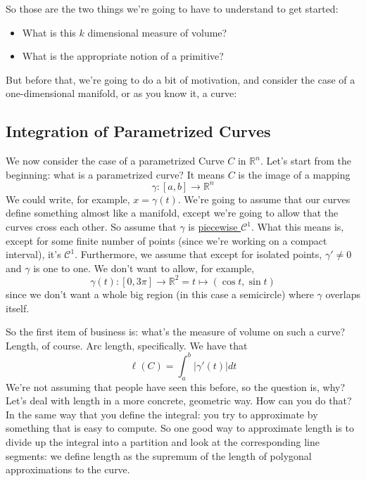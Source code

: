 \documentclass{article}
\newcommand{\reals}[0]{\mathbb{R}}
\newcommand{\mc}[1]{\mathcal{#1}}
\begin{document}
So those are the two things we're going to have to understand to get started:
\begin{itemize}
  \item What is this \(k\) dimensional measure of volume?
  \item What is the appropriate notion of a primitive?
\end{itemize}
But before that, we're going to do a bit of motivation, and consider the case of a one-dimensional manifold, or as you know it, a curve:

\subsection{Integration of Parametrized Curves}

We now consider the case of a parametrized Curve \(C\) in \(\reals^n\). Let's start from the beginning: what is a parametrized curve? It means \(C\) is the image of a mapping
\begin{equation}
  \gamma : [a, b] \to \reals^n
\end{equation}
We could write, for example, \(x = \gamma(t)\). We're going to assume that our curves define something almost like a manifold, except we're going to allow that the curves cross each other. So assume that \(\gamma\) is \underline{piecewise \(\mc{C}^1\)}. What this means is, except for some finite number of points (since we're working on a compact interval), it's \(\mc{C}^1\). Furthermore, we assume that except for isolated points, \(\gamma' \neq 0\) and \(\gamma\) is one to one.
We don't want to allow, for example,
\begin{equation}
  \gamma(t): [0, 3\pi] \to \reals^2 = t \mapsto (\cos t, \sin t)
\end{equation}
since we don't want a whole big region (in this case a semicircle) where \(\gamma\) overlaps itself.

So the first item of business is: what's the measure of volume on such a curve? Length, of course. Arc length, specifically. We have that
\begin{equation}
  \ell(C) = \int_a^b|\gamma'(t)|dt
\end{equation}
We're not assuming that people have seen this before, so the question is, why? Let's deal with length in a more concrete, geometric way. How can you do that? In the same way that you define the integral: you try to approximate by something that is easy to compute. So one good way to approximate length is to divide up the integral into a partition and look at the corresponding line segments: we define length as the supremum of the length of polygonal approximations to the curve.
\end{document}

